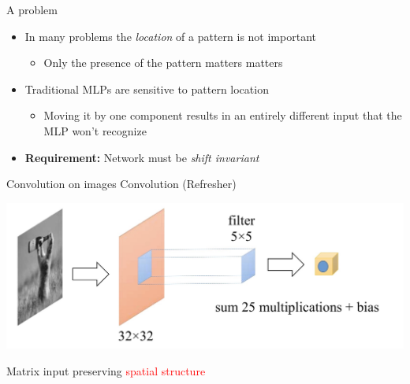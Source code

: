 \documentclass[default, aspectratio=169]{beamer}
\begin{document}
	\begin{frame}{A problem}
		\begin{itemize}
			\item In many problems the \textit{location} of a pattern is not important
			\begin{itemize}
				\item Only the presence of the pattern matters matters
			\end{itemize}
			\item Traditional MLPs are sensitive to pattern location
			\begin{itemize}
				\item Moving it by one component results in an entirely different input that the MLP won’t recognize
			\end{itemize}
			
			\item \textbf{Requirement:} Network must be \textit{shift invariant}
		\end{itemize}
	\end{frame}
	\begin{frame}{Convolution on images}
		Convolution (Refresher)
		\begin{center}
			\includegraphics[keepaspectratio, scale=0.2]{pic/conv.jpg}
			
			Matrix input preserving \textcolor{red}{spatial structure}
		\end{center}
		
	\end{frame}
\end{document}
